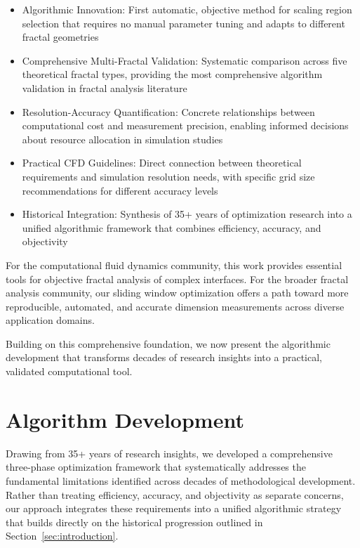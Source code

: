 \documentclass[preprint,12pt]{elsarticle}
\def\textbf#1{#1}%
\begin{document}
\begin{itemize}
\item \textbf{Algorithmic Innovation}: First automatic, objective method for scaling region selection that requires no manual parameter tuning and adapts to different fractal geometries

\item \textbf{Comprehensive Multi-Fractal Validation}: Systematic comparison across five theoretical fractal types, providing the most comprehensive algorithm validation in fractal analysis literature

\item \textbf{Resolution-Accuracy Quantification}: Concrete relationships between computational cost and measurement precision, enabling informed decisions about resource allocation in simulation studies

\item \textbf{Practical CFD Guidelines}: Direct connection between theoretical requirements and simulation resolution needs, with specific grid size recommendations for different accuracy levels

\item \textbf{Historical Integration}: Synthesis of 35+ years of optimization research into a unified algorithmic framework that combines efficiency, accuracy, and objectivity
\end{itemize}

For the computational fluid dynamics community, this work provides essential tools for objective fractal analysis of complex interfaces. For the broader fractal analysis community, our sliding window optimization offers a path toward more reproducible, automated, and accurate dimension measurements across diverse application domains.

Building on this comprehensive foundation, we now present the algorithmic development that transforms decades of research insights into a practical, validated computational tool.


\section{Algorithm Development}
\label{sec:algorithm}

Drawing from 35+ years of research insights, we developed a comprehensive three-phase optimization framework that systematically addresses the fundamental limitations identified across decades of methodological development. Rather than treating efficiency, accuracy, and objectivity as separate concerns, our approach integrates these requirements into a unified algorithmic strategy that builds directly on the historical progression outlined in Section~\ref{sec:introduction}.
\end{document}
